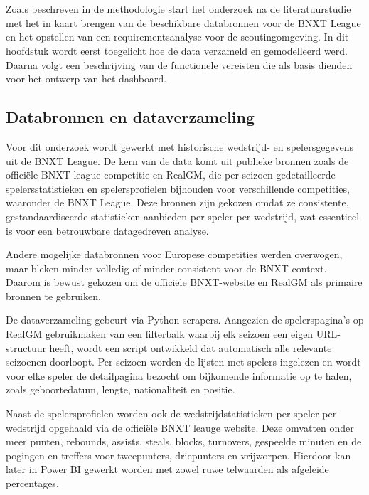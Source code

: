 \chapter{}%
\label{ch:onderzoek}

Zoals beschreven in de methodologie start het onderzoek na de literatuurstudie met het in kaart brengen van de beschikbare databronnen voor de BNXT League en het opstellen van een requirementsanalyse voor de scoutingomgeving. In dit hoofdstuk wordt eerst toegelicht hoe de data verzameld en gemodelleerd werd. Daarna volgt een beschrijving van de functionele vereisten die als basis dienden voor het ontwerp van het dashboard.

\section{Databronnen en dataverzameling}%
\label{sec:databronnen}

Voor dit onderzoek wordt gewerkt met historische wedstrijd- en spelersgegevens uit de BNXT League. De kern van de data komt uit publieke bronnen zoals de officiële BNXT league competitie en RealGM, die per seizoen gedetailleerde spelersstatistieken en spelersprofielen bijhouden voor verschillende competities, waaronder de BNXT League. Deze bronnen zijn gekozen omdat ze consistente, gestandaardiseerde statistieken aanbieden per speler per wedstrijd, wat essentieel is voor een betrouwbare datagedreven analyse.

Andere mogelijke databronnen voor Europese competities werden overwogen, maar bleken minder volledig of minder consistent voor de BNXT-context. Daarom is bewust gekozen om de officiële BNXT-website en RealGM als primaire bronnen te gebruiken.

De dataverzameling gebeurt via Python scrapers. Aangezien de spelerspagina's op RealGM gebruikmaken van een filterbalk waarbij elk seizoen een eigen URL-structuur heeft, wordt een script ontwikkeld dat automatisch alle relevante seizoenen doorloopt. Per seizoen worden de lijsten met spelers ingelezen en wordt voor elke speler de detailpagina bezocht om bijkomende informatie op te halen, zoals geboortedatum, lengte, nationaliteit en positie.

Naast de spelersprofielen worden ook de wedstrijdstatistieken per speler per wedstrijd opgehaald via de officiële BNXT leauge website. Deze omvatten onder meer punten, rebounds, assists, steals, blocks, turnovers, gespeelde minuten en de pogingen en treffers voor tweepunters, driepunters en vrijworpen. Hierdoor kan later in Power BI gewerkt worden met zowel ruwe telwaarden als afgeleide percentages.

